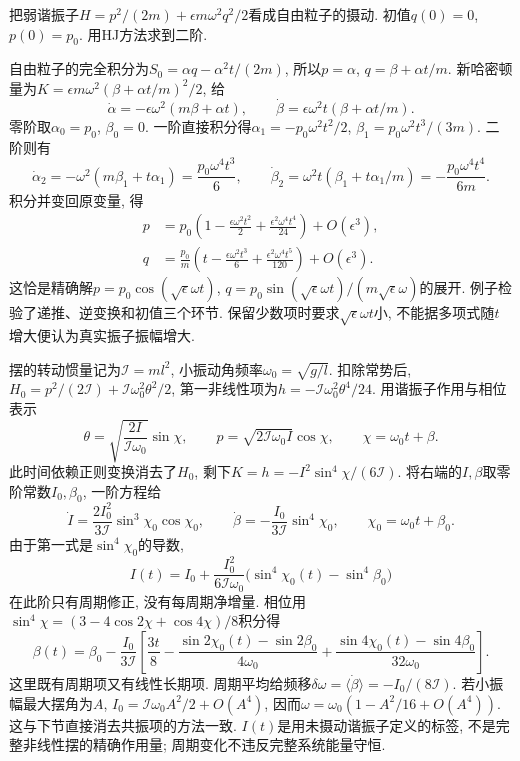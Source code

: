 \begin{example}
把弱谐振子$H=p^2/(2m)+\epsilon m\omega^2q^2/2$看成自由粒子的摄动. 初值$q(0)=0$, $p(0)=p_0$. 用HJ方法求到二阶.
\end{example}
\begin{solution}
自由粒子的完全积分为$S_0=\alpha q-\alpha^2t/(2m)$, 所以$p=\alpha$, $q=\beta+\alpha t/m$. 新哈密顿量为$K=\epsilon m\omega^2(\beta+\alpha t/m)^2/2$, 给
\[
\dot\alpha=-\epsilon\omega^2(m\beta+\alpha t),\qquad
\dot\beta=\epsilon\omega^2t(\beta+\alpha t/m).
\]
零阶取$\alpha_0=p_0$, $\beta_0=0$. 一阶直接积分得$\alpha_1=-p_0\omega^2t^2/2$, $\beta_1=p_0\omega^2t^3/(3m)$. 二阶则有
\[
\dot\alpha_2=-\omega^2(m\beta_1+t\alpha_1)
=\frac{p_0\omega^4t^3}{6},\qquad
\dot\beta_2=\omega^2t(\beta_1+t\alpha_1/m)
=-\frac{p_0\omega^4t^4}{6m}.
\]
积分并变回原变量, 得
\[
\begin{aligned}
p&=p_0\left(1-\frac{\epsilon\omega^2t^2}{2}
+\frac{\epsilon^2\omega^4t^4}{24}\right)+O(\epsilon^3),\\
q&=\frac{p_0}{m}\left(t-\frac{\epsilon\omega^2t^3}{6}
+\frac{\epsilon^2\omega^4t^5}{120}\right)+O(\epsilon^3).
\end{aligned}
\]
这恰是精确解$p=p_0\cos(\sqrt\epsilon\omega t)$, $q=p_0\sin(\sqrt\epsilon\omega t)/(m\sqrt\epsilon\omega)$的展开. 例子检验了递推、逆变换和初值三个环节. 保留少数项时要求$\sqrt\epsilon\omega t$小, 不能据多项式随$t$增大便认为真实振子振幅增大.
\end{solution}

摆的转动惯量记为$\mathcal I=ml^2$, 小振动角频率$\omega_0=\sqrt{g/l}$. 扣除常势后, $H_0=p^2/(2\mathcal I)+\mathcal I\omega_0^2\theta^2/2$, 第一非线性项为$h=-\mathcal I\omega_0^2\theta^4/24$. 用谐振子作用与相位表示
\[
\theta=\sqrt{\frac{2I}{\mathcal I\omega_0}}\sin\chi,
\qquad p=\sqrt{2\mathcal I\omega_0I}\cos\chi,
\qquad \chi=\omega_0t+\beta.
\]
此时间依赖正则变换消去了$H_0$, 剩下$K=h=-I^2\sin^4\chi/(6\mathcal I)$. 将右端的$I,\beta$取零阶常数$I_0,\beta_0$, 一阶方程给
\[
\dot I=\frac{2I_0^2}{3\mathcal I}\sin^3\chi_0\cos\chi_0,
\qquad \dot\beta=-\frac{I_0}{3\mathcal I}\sin^4\chi_0,
\qquad \chi_0=\omega_0t+\beta_0.
\]
由于第一式是$\sin^4\chi_0$的导数,
\[
I(t)=I_0+\frac{I_0^2}{6\mathcal I\omega_0}
\bigl(\sin^4\chi_0(t)-\sin^4\beta_0\bigr)
\]
在此阶只有周期修正, 没有每周期净增量. 相位用$\sin^4\chi=(3-4\cos2\chi+\cos4\chi)/8$积分得
\[
\beta(t)=\beta_0-\frac{I_0}{3\mathcal I}
\left[\frac{3t}{8}-\frac{\sin2\chi_0(t)-\sin2\beta_0}{4\omega_0}
+\frac{\sin4\chi_0(t)-\sin4\beta_0}{32\omega_0}\right].
\]
这里既有周期项又有线性长期项. 周期平均给频移$\delta\omega=\langle\dot\beta\rangle=-I_0/(8\mathcal I)$. 若小振幅最大摆角为$A$, $I_0=\mathcal I\omega_0A^2/2+O(A^4)$, 因而$\omega=\omega_0(1-A^2/16+O(A^4))$. 这与下节直接消去共振项的方法一致. $I(t)$是用未摄动谐振子定义的标签, 不是完整非线性摆的精确作用量; 周期变化不违反完整系统能量守恒.

